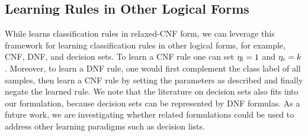\subsection{Learning Rules in Other Logical Forms}
\label{interpretability_crr_sec:other_rules}
While {\crr} learns  classification rules in relaxed-CNF form, we can leverage this framework for learning classification rules in other logical forms, for example, CNF,  DNF, and decision sets. To learn a CNF rule one can set  $ \eta_l=1 $ and $ \eta_c=k $. Moreover,  to learn a DNF rule,  one would first complement the class label of all samples, then learn a CNF rule by setting the parameters as described and finally negate the learned rule. We note that the literature on decision sets also fits into our formulation, because decision sets can be represented by DNF formulas. As a future work, we are investigating whether related formulations could be used to address other learning paradigms such as decision lists.





